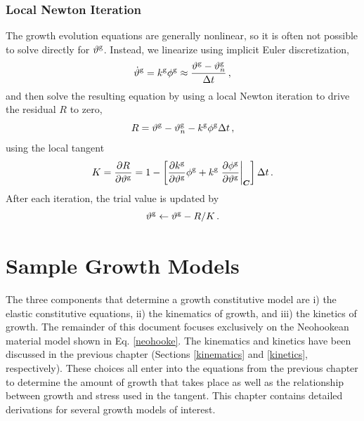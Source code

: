 \documentclass[10pt,letterpaper,oneside]{report}
\newcommand{\scas}[1]{\mbox{{\scriptsize{${\rm{#1}}$}}}{}}
\newcommand{\tens}[1]{\mbox{\boldmath{\scriptsize{$#1$}}}{}}
\begin{document}
\subsection{Local Newton Iteration}
\label{subsec:local_newton}
The growth evolution equations are generally nonlinear, so it is often not possible to solve directly for $\vartheta^{\scas{g}}$.  Instead, we linearize using implicit Euler discretization, 
\begin{equation}
\dot{\vartheta}^{\scas{g}} = k^{\scas{g}} \phi^{\scas{g}} \approx{} \frac{\vartheta^{\scas{g}} - \vartheta^{\scas{g}}_n }{\Delta t} \, , 
\end{equation}
and then solve the resulting equation by using a local Newton iteration to drive the residual $R$ to zero, 
\begin{equation}
R = \vartheta^{\scas{g}} - \vartheta^{\scas{g}}_n - k^{\scas{g}} \phi^{\scas{g}} \Delta t \, , 
\end{equation}
using the local tangent 
\begin{equation}
K = \frac{\partial R}{\partial \vartheta^{\scas{g}} } = 1 - \left[ \frac{\partial k^{\scas{g}}}{\partial \vartheta^{\scas{g}} } \phi^{\scas{g}} + k^{\scas{g}} \left. \frac{\partial \phi^{\scas{g}} }{\partial \vartheta^{\scas{g}} } \right|_{\tens{C}} \right] \Delta t \, . 
\end{equation}
After each iteration, the trial value is updated by
\begin{equation}
\vartheta^{\scas{g}} \leftarrow \vartheta^{\scas{g}} - R / K \, .  
\end{equation}



\chapter{Sample Growth Models}

The three components that determine a growth constitutive model are i) the elastic constitutive equations, ii) the kinematics of growth, and iii) the kinetics of growth.  The remainder of this document focuses exclusively on the Neohookean material model shown in Eq. \ref{neohooke}. The kinematics and kinetics have been discussed in the previous chapter (Sections \ref{kinematics} and \ref{kinetics}, respectively). 
These choices all enter into the equations from the previous chapter to determine the amount of growth that takes place as well as the relationship between growth and stress used in the tangent.  This chapter contains detailed derivations for several growth models of interest.  
\end{document}
